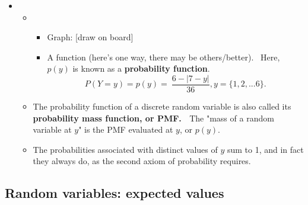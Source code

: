 \documentclass[11pt]{article}
\begin{document}
\begin{itemize}
\item 
\begin{itemize}
\item 
\begin{itemize}
\item Graph: [draw on board]

\item A function (here's one way, there may be others/better). \ Here, $p(y)$
is known as a \textbf{probability function}. 
\begin{equation*}
P(Y=y)=p(y)=\ \frac{6-|7-y|}{36},y=\{1,2,...6\}.
\end{equation*}
\end{itemize}

\item The probability function of a discrete random variable is also called
its \textbf{probability mass function, or PMF. \ }The "mass of a random
variable at $y$" is the PMF evaluated at $y$, or $p\left( y\right) .$

\item The probabilities associated with distinct values of $y$ sum to 1, and
in fact they always do, as the second axiom of probability requires.
\end{itemize}
\end{itemize}

\subsection{Random variables: expected values}
\end{document}
